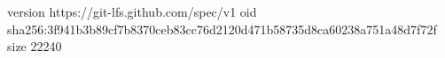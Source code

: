 version https://git-lfs.github.com/spec/v1
oid sha256:3f941b3b89cf7b8370ceb83cc76d2120d471b58735d8ca60238a751a48d7f72f
size 22240
